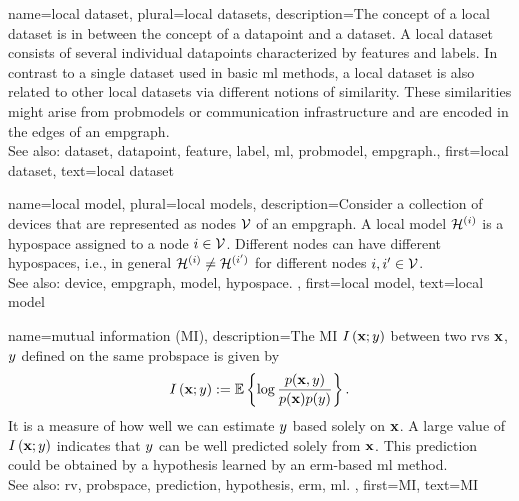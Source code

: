 	
{name={local dataset}, plural={local datasets}, 
	description={The concept of a local \gls{dataset} is 
		in between the concept of a \gls{datapoint} and a \gls{dataset}. A local \gls{dataset} consists of several 
		individual \glspl{datapoint} characterized by \glspl{feature} and \glspl{label}. 
		In contrast to a single \gls{dataset} used in basic \gls{ml} methods, a local \gls{dataset} is also 
		related to other local \glspl{dataset} via different notions of similarity. These similarities 
		might arise from \glspl{probmodel} or communication infrastructure and 
		are encoded in the edges of an \gls{empgraph}.
				\\
		See also: \gls{dataset}, \gls{datapoint}, \gls{feature}, \gls{label}, \gls{ml}, \gls{probmodel}, \gls{empgraph}.},
		first={local dataset},
		text={local dataset}
}
	
{name={local model}, plural={local models}, 
	description={Consider a collection of \glspl{device} that are represented 
		as nodes $\mathcal{V}$ of an \gls{empgraph}. A local \gls{model} $\mathcal{H}^{(i)}$ 
		is a \gls{hypospace} assigned to a node $i \in \mathcal{V}$. Different nodes can have 
		different \glspl{hypospace}, i.e., in general $\mathcal{H}^{(i)} \neq \mathcal{H}^{(i')}$ 
		for different nodes $i, i' \in \mathcal{V}$. 
				\\
		See also: \gls{device}, \gls{empgraph}, \gls{model}, \gls{hypospace}. },
	first={local model},
	text={local model}
}
	
{name={mutual information (MI)},
 	description={The MI $I \left( {\bf x};y\right)$ 
 		between two \glspl{rv} ${\bf x}$, $y$ defined on the same \gls{probspace} 
 		is given by \cite{coverthomas} $$I \left( {\bf x};y\right) := 
		\mathbb{E} \left\{ \log \frac{p ({\bf x},y)}{p({\bf x})p(y)} \right\}.$$ 
		It is a measure of how well we can estimate $y$ based 
		solely on ${\bf x}$. A large value of $I \left( {\bf x};y\right)$ indicates that 
		$y$ can be well predicted solely from ${\bf x}$. This \gls{prediction} could be obtained by a 
		\gls{hypothesis} learned by an \gls{erm}-based \gls{ml} method. 
				\\
		See also: \gls{rv}, \gls{probspace}, \gls{prediction}, \gls{hypothesis}, \gls{erm}, \gls{ml}. }, 
	first={MI}, 
	text={MI} 
}

